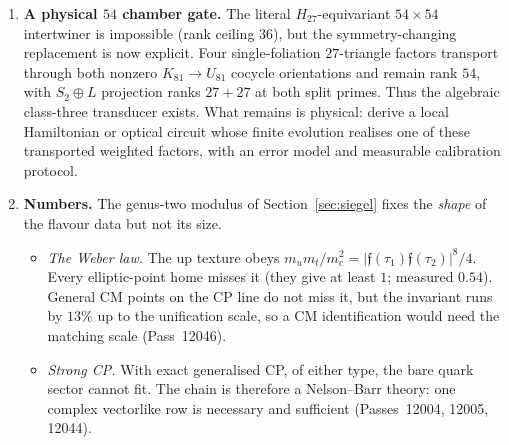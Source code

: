 \begin{enumerate}[label=\textbf{\arabic*.},leftmargin=1.6em,itemsep=5pt]
      order parameter: the two nonsplit cocycle orientations $s=\pm1$ are exchanged by qutrit
      complex conjugation, $\Psi(x\star_s y)=\Psi(x)\star_{-s}\Psi(y)$, and their class-three
      central tick reverses sign. 
      The remaining problem is dynamical rather than combinatorial: what selects one sign, and does
      that selected finite orientation couple to the unique global chirality character of
      $\PGSp(4,3)$ (Holotrade 98cafff, P11091) in a physical vacuum? Theorem~9.8 gives the outside datum a
      name: the antiunitary coset is the generalised CP of the genus-two modulus, so the orientation is set by
      whether the vacuum value of $\Omega$ lies off the CP-real locus, and the open question becomes what
      stabilises $\Omega$.
\item \textbf{A physical $54$ chamber gate.} The literal $H_{27}$-equivariant
      $54\times54$ intertwiner is impossible (rank ceiling $36$), but the symmetry-changing
      replacement is now explicit. Four single-foliation $27$-triangle factors transport through
      both nonzero $K_{81}\to U_{81}$ cocycle orientations and remain rank $54$, with
      $S_2\oplus L$ projection ranks $27+27$ at both split primes. Thus the algebraic
      class-three transducer exists. 
      What remains is physical: derive a local Hamiltonian or optical circuit whose finite
      evolution realises one of these transported weighted factors, with an error model and
      measurable calibration protocol.
\item \textbf{Numbers.} The genus-two modulus of Section~\ref{sec:siegel} fixes the \emph{shape} of the
      flavour data but not its size.
      \begin{itemize}
      \item \emph{The Weber law.} The up texture obeys $m_um_t/m_c^2=|\mathfrak f(\tau_1)\mathfrak f(\tau_2)|^8/4$.
            Every elliptic-point home misses it (they give at least $1$; measured $0.54$). General CM points on the
            CP line do not miss it, but the invariant runs by $13\%$ up to the unification scale, so a CM
            identification would need the matching scale (Pass~12046).
      \item \emph{Strong CP.} With exact generalised CP, of either type, the bare quark sector cannot fit. The chain is
            therefore a Nelson--Barr theory: one complex vectorlike row is necessary and sufficient (Passes~12004,
            12005, 12044).

\end{itemize}
\end{enumerate}
